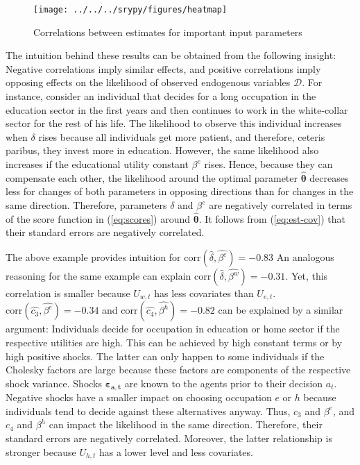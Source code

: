 \documentclass[a4paper,12pt]{article}
\begin{document}
\begin{figure}[H]
	\caption{Correlations between estimates for important input parameters}
	\centering
	\texttt{[image: ../../../srypy/figures/heatmap]}
	\label{fig:corr}
\end{figure}
\noindent
The intuition behind these results can be obtained from the following insight: Negative correlations imply similar effects, and positive correlations imply opposing effects on the likelihood of observed endogenous variables $\pmb{\mathcal{D}}$. For instance, consider an individual that decides for a long occupation in the education sector in the first years and then continues to work in the white-collar sector for the rest of his life. The likelihood to observe this individual increases when $\delta$ rises because all individuals get more patient, and therefore, ceteris paribus, they invest more in education. However, the same likelihood also increases if the educational utility constant $\beta^e$ rises. Hence, because they can compensate each other, the likelihood around the optimal parameter $\pmb{\hat{\theta}}$ decreases less for changes of both parameters in opposing directions than for changes in the same direction. Therefore, parameters $\delta$ and $\beta^e$ are negatively correlated in terms of the score function in (\ref{eq:scores}) around $\pmb{\hat{\theta}}$. It follows from (\ref{eq:est-cov}) that their standard errors are negatively correlated.

The above example provides intuition for $\text{corr}(\hat{\delta},\hat{\beta^e})=-0.83$ An analogous reasoning for the same example can explain $\text{corr}(\hat{\delta},\hat{\beta^w})=-0.31$. Yet, this correlation is smaller because $U_{w,t}$ has less covariates than $U_{e,t}$. $\text{corr}(\hat{c_3},\hat{\beta^e})=-0.34$ and $\text{corr}(\hat{c_4},\hat{\beta^h})=-0.82$ can be explained by a similar argument: Individuals decide for occupation in education or home sector if the respective utilities are high. This can be achieved by high constant terms or by high positive shocks. The latter can only happen to some individuals if the Cholesky factors are large because these factors are components of the respective shock variance. Shocks $\pmb{\varepsilon_{a,t}}$ are known to the agents prior to their decision $a_t$. Negative shocks have a smaller impact on choosing occupation $e$ or $h$ because individuals tend to decide against these alternatives anyway. Thus, $c_3$ and $\beta^e$, and $c_4$ and $\beta^h$ can impact the likelihood in the same direction. Therefore, their standard errors are negatively correlated. Moreover, the latter relationship is stronger because $U_{h,t}$ has a lower level and less covariates.
\end{document}
